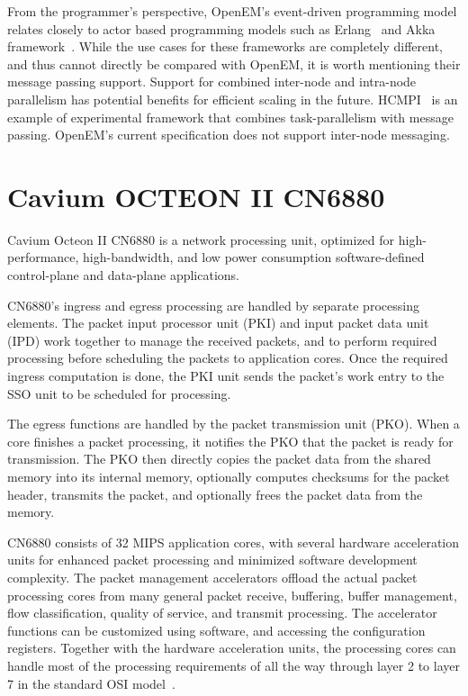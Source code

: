 From the programmer's perspective, OpenEM's event-driven programming model relates closely to actor based programming models such as Erlang~\cite{Armstrong:1996:CPE} and Akka framework~\cite{Akka}. While the use cases for these frameworks are completely different, and thus cannot directly be compared with OpenEM, it is worth mentioning their message passing support. Support for combined inter-node and intra-node parallelism has potential benefits for efficient scaling in the future. HCMPI~\cite{Chatterjee:2013:HCMPI} is an example of experimental framework that combines task-parallelism with message passing. OpenEM's current specification does not support inter-node messaging.

\section{Cavium OCTEON II CN6880}
\label{sec:cavium-octeon}
Cavium Octeon II CN6880 is a network processing unit, optimized for high-performance, high-bandwidth, and low power consumption software-defined control-plane and data-plane applications.

CN6880's ingress and egress processing are handled by separate processing elements. The packet input processor unit (PKI) and input packet data unit (IPD) work together to manage the received packets, and to perform required processing before scheduling the packets to application cores. Once the required ingress computation is done, the PKI unit sends the packet's work entry to the SSO unit to be scheduled for processing.~\cite{cavium:2010:fundamentals}

The egress functions are handled by the packet transmission unit (PKO). When a core finishes a packet processing, it notifies the PKO that the packet is ready for transmission. The PKO then directly copies the packet data from the shared memory into its internal memory, optionally computes checksums for the packet header, transmits the packet, and optionally frees the packet data from the memory.~\cite{cavium:2010:fundamentals}

CN6880 consists of 32 MIPS application cores, with several hardware acceleration units for enhanced packet processing and minimized software development complexity. The packet management accelerators offload the actual packet processing cores from many general packet receive, buffering, buffer management, flow classification, quality of service, and transmit processing. The accelerator functions can be customized using software, and accessing the configuration registers. Together with the hardware acceleration units, the processing cores can handle most of the processing requirements of all the way through layer 2 to layer 7 in the standard OSI model~\cite{ISO:1994:OSI}.~\cite{cavium:2010:fundamentals}

